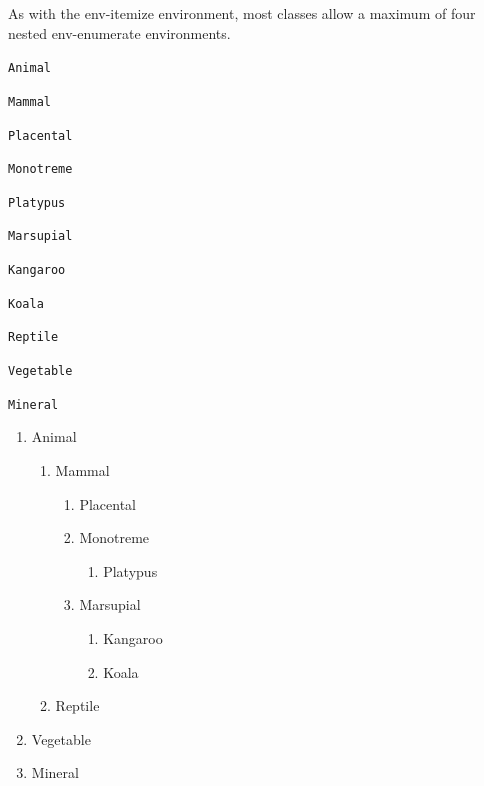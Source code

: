 
As with the \gls{env-itemize} environment, most classes allow a
maximum of four nested \gls{env-enumerate} environments.

\begin{code}
\begin{alltt}
  Animal

    Mammal

     Placental

     Monotreme

       Platypus

     Marsupial

      Kangaroo

      Koala

    Reptile

  Vegetable

  Mineral
\end{alltt}
\end{code}
\begin{result}
\begin{enumerate}
 \item Animal
 \begin{enumerate}
   \item Mammal

   \begin{enumerate}
    \item Placental

    \item Monotreme
    \begin{enumerate}
      \item Platypus
    \end{enumerate}


    \item Marsupial

    \begin{enumerate}
     \item Kangaroo

     \item Koala
    \end{enumerate}
   \end{enumerate}

   \item Reptile
 \end{enumerate}

 \item Vegetable

 \item Mineral
\end{enumerate}
\end{result}

